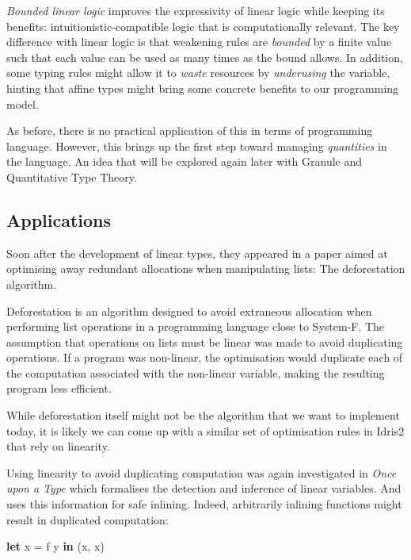 \documentclass[
]{article}
\newenvironment{Shaded}{}{}
\newcommand{\KeywordTok}[1]{\textcolor[rgb]{0.00,0.44,0.13}{\textbf{#1}}}
\newcommand{\NormalTok}[1]{#1}
\newcommand{\OtherTok}[1]{\textcolor[rgb]{0.00,0.44,0.13}{#1}}
\begin{document}
\emph{Bounded linear logic}\cite{bll} improves the expressivity of
linear logic while keeping its benefits: intuitionistic-compatible logic
that is computationally relevant. The key difference with linear logic
is that weakening rules are \emph{bounded} by a finite value such that
each value can be used as many times as the bound allows. In addition,
some typing rules might allow it to \emph{waste} resources by
\emph{underusing} the variable, hinting that affine types might bring
some concrete benefits to our programming model.

As before, there is no practical application of this in terms of
programming language. However, this brings up the first step toward
managing \emph{quantities} in the language. An idea that will be
explored again later with
Granule\cite{granule}\cite{effect_coeffects_grading}\cite{graded_monads_rings}\cite{monads_and_effects}
and Quantitative Type Theory\cite{qtt}\cite{nuttin}.

\hypertarget{applications}{%
\subsection{Applications}\label{applications}}

Soon after the development of linear types, they appeared in a paper
aimed at optimising away redundant allocations when manipulating lists:
The deforestation algorithm.

Deforestation\cite{deforestation} is an algorithm designed to avoid
extraneous allocation when performing list operations in a programming
language close to System-F. The assumption that operations on lists must
be linear was made to avoid duplicating operations. If a program was
non-linear, the optimisation would duplicate each of the computation
associated with the non-linear variable, making the resulting program
less efficient.

While deforestation itself might not be the algorithm that we want to
implement today, it is likely we can come up with a similar set of
optimisation rules in Idris2 that rely on linearity.

Using linearity to avoid duplicating computation was again investigated
in \emph{Once upon a Type}\cite{once_upon_a_type} which formalises the
detection and inference of linear variables. And uses this information
for safe inlining. Indeed, arbitrarily inlining functions might result
in duplicated computation:

\begin{Shaded}
\begin{Highlighting}[]
\KeywordTok{let}\NormalTok{ x }\OtherTok{=}\NormalTok{ f y }\KeywordTok{in}
\NormalTok{    (x, x)}
\end{Highlighting}
\end{Shaded}
\end{document}
